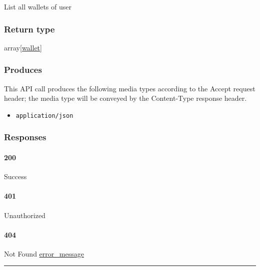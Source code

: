 List all wallets of user

\hypertarget{return-type-67}{%
\subsubsection{Return type}\label{return-type-67}}

array{[}\protect\hyperlink{wallet}{wallet}{]}

\hypertarget{produces-82}{%
\subsubsection{Produces}\label{produces-82}}

This API call produces the following media types according to the
{Accept} request header; the media type will be conveyed by the
{Content-Type} response header.

\begin{itemize}
\tightlist
\item
  \texttt{application/json}
\end{itemize}

\hypertarget{responses-84}{%
\subsubsection{Responses}\label{responses-84}}

\hypertarget{section-274}{%
\paragraph{200}\label{section-274}}

Success

\hypertarget{section-275}{%
\paragraph{401}\label{section-275}}

Unauthorized \protect\hyperlink{}{}

\hypertarget{section-276}{%
\paragraph{404}\label{section-276}}

Not Found \protect\hyperlink{error_message}{error\_message}

\begin{center}\rule{0.5\linewidth}{\linethickness}\end{center}

